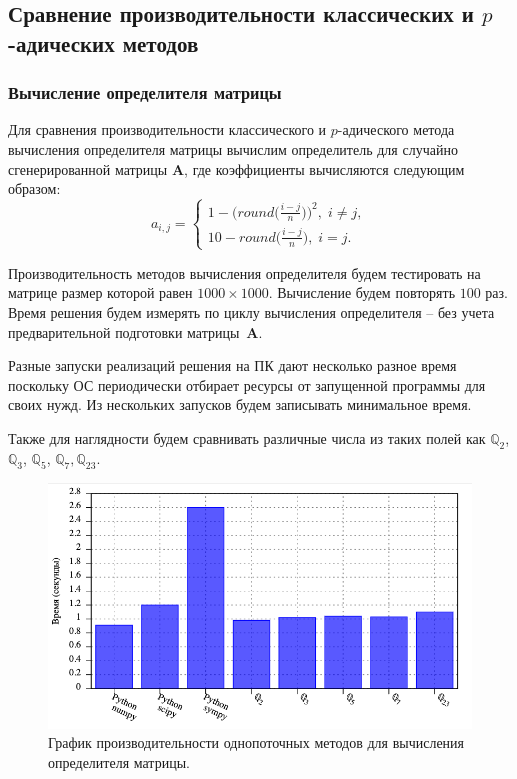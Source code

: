 \documentclass[master, och, diploma, times]{sty/SCWorks}
\theoremstyle{plain}
\theoremstyle{definition}
\numberwithin{equation}{section}
\begin{document}
\subsection{Сравнение производительности классических и $p$-адических \mbox{методов}}

\subsubsection{Вычисление определителя матрицы}

Для сравнения производительности классического и $p$-адического метода вычисления определителя матрицы вычислим определитель для случайно сгенерированной матрицы $\boldsymbol{A}$, где коэффициенты вычисляются следующим образом:
\begin{equation}
a_{i,j}= 
\begin{cases} 
1-\bigg(round\bigg(\frac{i-j}{n}\bigg)\bigg)^2, \; i \neq j, \\ 
10-round\bigg(\frac{i-j}{n}\bigg), \; i = j.
\end{cases}
\end{equation}

Производительность методов вычисления определителя будем \mbox{тестировать} на матрице размер которой равен $1000 \times 1000$. Вычисление будем повторять $100$ раз. Время решения будем измерять по циклу вычисления определителя – без учета предварительной подготовки \mbox{матрицы $\boldsymbol{A}$}.

Разные запуски реализаций решения на ПК дают несколько разное время поскольку ОС периодически отбирает ресурсы от запущенной программы для своих нужд. Из нескольких запусков будем записывать минимальное время.

Также для наглядности будем сравнивать различные числа из таких полей как $\mathbb{Q}_2$, $\mathbb{Q}_3$, $\mathbb{Q}_5$, $\mathbb{Q}_7, \mathbb{Q}_{23}$.

\begin{figure}[H]
\centerline{\includegraphics[width=0.85\linewidth]{../gnuplot/single/det/plot.png}}
\caption{График производительности однопоточных методов для вычисления определителя матрицы.}
\label{img:single:det:1}
\end{figure}
\end{document}
